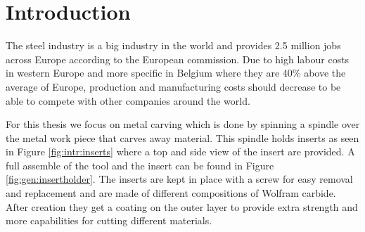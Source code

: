 
\chapter{Introduction}

    The steel industry is a big industry in the world and provides 2.5 million jobs across Europe according to the European commission. Due to high labour costs in western Europe and more specific in Belgium where they are 40\% above the average of Europe, production and manufacturing costs should decrease to be able to compete with other companies around the world. 
    
For this thesis we focus on metal carving which is done by spinning a spindle over the metal work piece that carves away material. This spindle holds inserts as seen in Figure \ref{fig:intr:inserts} where a top and side view of the insert are provided. A full assemble of the tool and the insert can be found in Figure \ref{fig:gen:insertholder}. The inserts are kept in place with a screw for easy removal and replacement and are made of different compositions of Wolfram carbide. After creation they get a coating on the outer layer to provide extra strength and more capabilities for cutting different materials. 


